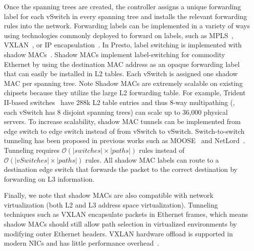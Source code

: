 Once the spanning trees are created, the controller assigns a unique forwarding label
for each vSwitch in every spanning tree and installs the relevant forwarding rules into the network.
Forwarding labels can be implemented in a variety of ways using
technologies commonly deployed to forward on labels,
such as MPLS~\cite{casado2012fabric}, VXLAN~\cite{conga,nv-mtd}, or IP encapsulation~\cite{drb}. 
In Presto,
label switching is implemented with shadow MACs~\cite{shadow-mac}. 
Shadow MACs implement label-switching for commodity Ethernet by using the 
destination MAC address as an opaque forwarding label that can easily be 
installed in L2 tables. 
Each vSwitch is assigned one shadow MAC per spanning tree.
Note Shadow MACs are extremely scalable on
existing chipsets because they utilize the large L2 forwarding table. For example,
Trident II-based switches~\cite{trident2,smart-table,arista} have 288k L2 table entries and 
thus 8-way multipathing (\ie{}, each vSwitch has 8 disjoint spanning trees)
can scale up to 36,000 physical servers. 
To increase scalability, shadow MAC tunnels can be implemented from 
edge switch to edge switch instead of from vSwitch to vSwitch. Switch-to-switch
tunneling has been proposed in previous works such as MOOSE~\cite{moose} and NetLord~\cite{netlord}. 
Tunneling requires $\mathcal{O}(|switches|\times|paths|)$ rules instead of
$\mathcal{O}(|vSwitches|\times|paths|)$ rules. All 
shadow MAC labels can route to a destination 
edge switch that forwards the packet to the correct destination by forwarding on 
L3 information.

Finally, we note that shadow MACs are also compatible with network virtualization 
(both L2 and L3 address space virtualization). 
Tunneling techniques such as VXLAN encapsulate packets in Ethernet frames, 
which means shadow MACs should still allow path selection 
in virtualized environments by modifying outer Ethernet headers.
VXLAN hardware offload is supported in modern NICs and has little
performance overhead~\cite{vxlan-bench}.

